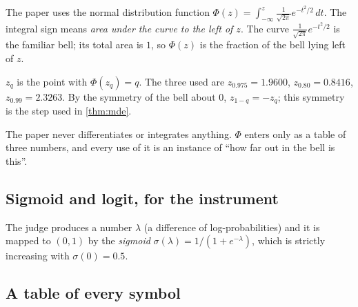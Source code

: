 The paper uses the normal distribution function
$\Phi(z)=\int_{-\infty}^{z}\tfrac{1}{\sqrt{2\pi}}e^{-t^2/2}\,dt$. The integral
sign means \emph{area under the curve to the left of $z$}. The curve
$\tfrac{1}{\sqrt{2\pi}}e^{-t^2/2}$ is the familiar bell; its total area is $1$, so
$\Phi(z)$ is the fraction of the bell lying left of $z$.

\begin{definition}
$z_q$ is the point with $\Phi(z_q)=q$. The three used are
$z_{0.975}=1.9600$, $z_{0.80}=0.8416$, $z_{0.99}=2.3263$. By the symmetry of the
bell about $0$, $z_{1-q}=-z_q$; this symmetry is the step used in
\cref{thm:mde}.
\end{definition}

\begin{remark}
The paper never differentiates or integrates anything. $\Phi$ enters only as a
table of three numbers, and every use of it is an instance of ``how far out in
the bell is this''.
\end{remark}

\subsection{Sigmoid and logit, for the instrument}

The judge produces a number $\lambda$ (a difference of log-probabilities) and it
is mapped to $(0,1)$ by the \emph{sigmoid}
$\sigma(\lambda)=1/(1+e^{-\lambda})$, which is strictly increasing with
$\sigma(0)=0.5$.


\subsection{A table of every symbol}

